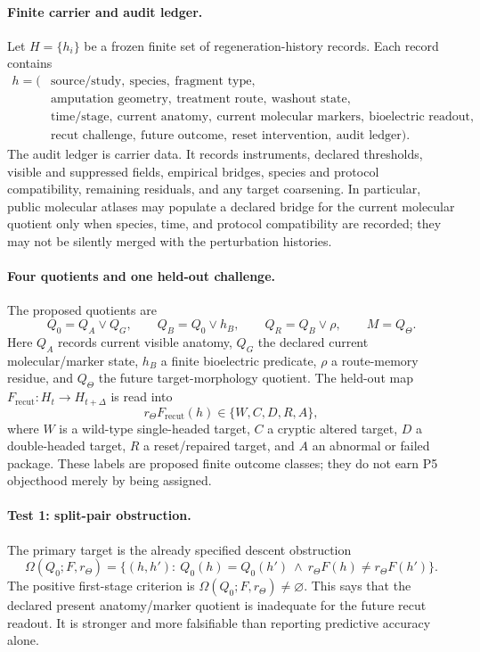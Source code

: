 \paragraph{Finite carrier and audit ledger.}
Let $H=\{h_i\}$ be a frozen finite set of regeneration-history records.  Each
record contains
\[
\begin{aligned}
h=(&\text{source/study},\ \text{species},\ \text{fragment type},\\
&\text{amputation geometry},\ \text{treatment route},
\ \text{washout state},\\
&\text{time/stage},\ \text{current anatomy},
\ \text{current molecular markers},\ \text{bioelectric readout},\\
&\text{recut challenge},\ \text{future outcome},\ \text{reset
intervention},\ \text{audit ledger}).
\end{aligned}
\]
The audit ledger is carrier data.  It records instruments, declared
thresholds, visible and suppressed fields, empirical bridges, species and
protocol compatibility, remaining residuals, and any target coarsening.  In
particular, public molecular atlases may populate a declared bridge for the
current molecular quotient only when species, time, and protocol
compatibility are recorded; they may not be silently merged with the
perturbation histories.

\paragraph{Four quotients and one held-out challenge.}
The proposed quotients are
\[
Q_0=Q_A\vee Q_G,
\qquad
Q_B=Q_0\vee h_B,
\qquad
Q_R=Q_B\vee\rho,
\qquad
M=Q_\Theta.
\]
Here $Q_A$ records current visible anatomy, $Q_G$ the declared current
molecular/marker state, $h_B$ a finite bioelectric predicate, $\rho$ a
route-memory residue, and $Q_\Theta$ the future target-morphology quotient.
The held-out map $F_{\mathrm{recut}}:H_t\to H_{t+\Delta}$ is read into
\[
r_\Theta F_{\mathrm{recut}}(h)\in\{W,C,D,R,A\},
\]
where $W$ is a wild-type single-headed target, $C$ a cryptic altered target,
$D$ a double-headed target, $R$ a reset/repaired target, and $A$ an abnormal
or failed package.  These labels are proposed finite outcome classes; they
do not earn P5 objecthood merely by being assigned.

\paragraph{Test 1: split-pair obstruction.}
The primary target is the already specified descent obstruction
\[
\Omega(Q_0;F,r_\Theta)
=\{(h,h'):\ Q_0(h)=Q_0(h')\ \wedge\
r_\Theta F(h)\ne r_\Theta F(h')\}.
\]
The positive first-stage criterion is
$\Omega(Q_0;F,r_\Theta)\ne\varnothing$.  This says that the declared present
anatomy/marker quotient is inadequate for the future recut readout.  It is
stronger and more falsifiable than reporting predictive accuracy alone.

